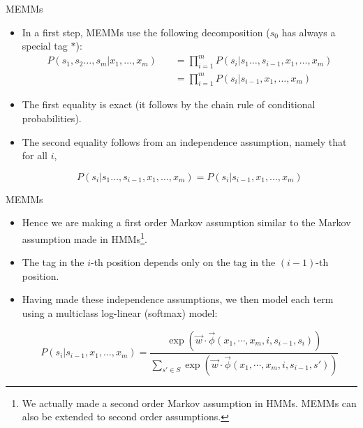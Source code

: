 \documentclass[handout]{beamer}
\begin{document}
\begin{frame}{MEMMs}
\begin{scriptsize}
\begin{itemize}
 \item In a first step, MEMMs use the following decomposition ($s_0$ has always a special tag $*$):
 \begin{equation}
\begin{split}
  P(s_1,s_2 \dots, s_m | x_1, \dots, x_m) \quad & =  \prod_{i=1}^{m}    P(s_i | s_1 \dots, s_{i-1}, x_1, \dots, x_m)\\
 \quad & =  \prod_{i=1}^{m}    P(s_i | s_{i-1}, x_1, \dots, x_m)
\end{split}
\end{equation}

\item The first equality is exact (it follows by the chain rule of conditional probabilities).

\item The second equality follows from an independence assumption, namely that for all $i$,

\begin{displaymath}
 P(s_i | s_1 \dots, s_{i-1}, x_1, \dots, x_m) =   P(s_i | s_{i-1}, x_1, \dots, x_m)
\end{displaymath}


 
\end{itemize}


\end{scriptsize}
\end{frame}


\begin{frame}{MEMMs}
\begin{scriptsize}
\begin{itemize}
 \item Hence we are making a first order Markov assumption similar to the Markov assumption made in HMMs\footnote{We actually made a second order Markov assumption in HMMs. MEMMs can also be extended to second order assumptions.}. 
 
 \item The tag in the $i$-th position depends only on the tag in the $(i -1)$-th position. 
 
 
 \item Having made these independence assumptions, we then model each term using a multiclass log-linear (softmax) model:
 
 \begin{equation}
 P(s_i | s_{i-1}, x_1, \dots, x_m)  =  \frac{\exp (\vec{w}\cdot \vec{\phi}(x_1, \cdots, x_m, i, s_{i-1},s_i))}{\sum_{s' \in S} \exp (\vec{w}\cdot \vec{\phi}(x_1, \cdots, x_m, i, s_{i-1},s'))}
\end{equation}


 
\end{itemize}


\end{scriptsize}
\end{frame}
\end{document}
